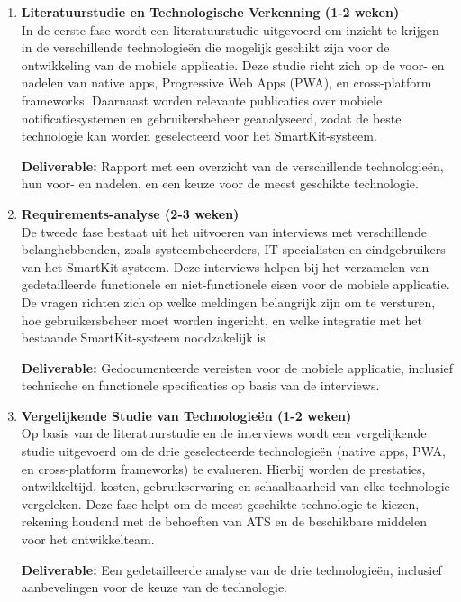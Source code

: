 \begin{enumerate}[label=\textbf{Fase \arabic*:}, left=0pt, labelsep=1em, itemsep=1em, topsep=1em]
	
	\item \textbf{Literatuurstudie en Technologische Verkenning (1-2 weken)} \\
	In de eerste fase wordt een literatuurstudie uitgevoerd om inzicht te krijgen in de verschillende technologieën die mogelijk geschikt zijn voor de ontwikkeling van de mobiele applicatie. Deze studie richt zich op de voor- en nadelen van native apps, Progressive Web Apps (PWA), en cross-platform frameworks. Daarnaast worden relevante publicaties over mobiele notificatiesystemen en gebruikersbeheer geanalyseerd, zodat de beste technologie kan worden geselecteerd voor het SmartKit-systeem.
	
	\textbf{Deliverable:} Rapport met een overzicht van de verschillende technologieën, hun voor- en nadelen, en een keuze voor de meest geschikte technologie.
	
	\item \textbf{Requirements-analyse (2-3 weken)} \\
	De tweede fase bestaat uit het uitvoeren van interviews met verschillende belanghebbenden, zoals systeembeheerders, IT-specialisten en eindgebruikers van het SmartKit-systeem. Deze interviews helpen bij het verzamelen van gedetailleerde functionele en niet-functionele eisen voor de mobiele applicatie. De vragen richten zich op welke meldingen belangrijk zijn om te versturen, hoe gebruikersbeheer moet worden ingericht, en welke integratie met het bestaande SmartKit-systeem noodzakelijk is.
	
	\textbf{Deliverable:} Gedocumenteerde vereisten voor de mobiele applicatie, inclusief technische en functionele specificaties op basis van de interviews.
	
	\item \textbf{Vergelijkende Studie van Technologieën (1-2 weken)} \\
	Op basis van de literatuurstudie en de interviews wordt een vergelijkende studie uitgevoerd om de drie geselecteerde technologieën (native apps, PWA, en cross-platform frameworks) te evalueren. Hierbij worden de prestaties, ontwikkeltijd, kosten, gebruikservaring en schaalbaarheid van elke technologie vergeleken. Deze fase helpt om de meest geschikte technologie te kiezen, rekening houdend met de behoeften van ATS en de beschikbare middelen voor het ontwikkelteam.
	
	\textbf{Deliverable:} Een gedetailleerde analyse van de drie technologieën, inclusief aanbevelingen voor de keuze van de technologie.
	

\end{enumerate}
